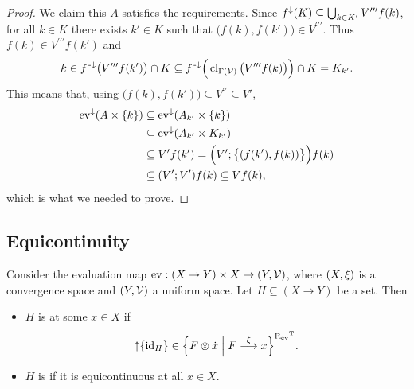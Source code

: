 \begin{proof}
We claim this $A$ satisfies the requirements. Since $f^\downarrow(K)\subseteq \bigcup_{k\in K'}V^{\prime\prime\prime}f(k)$, for all $k\in K$ there exists $k'\in K$ such that $\big(f(k), f(k')\big)\in V^{\prime\prime\prime}$. Thus $f(k) \in V^{\prime\prime\prime}f(k')$ and
\[ k\in f^{\text{\hspace{0.15em}-}\downarrow}\big(V^{\prime\prime\prime}f(k')\big)\cap K \subseteq f^{\text{\hspace{0.15em}-}\downarrow}\Big(\operatorname{cl}_{\Gamma(\mathcal{V})}\big(V^{\prime\prime\prime}f(k)\big)\Big)\cap K = K_{k'}. \]
This means that, using $\big(f(k), f(k')\big)\subseteq V^{\prime\prime}\subseteq V'$,
\begin{align*}
\operatorname{ev}^\downarrow(A\times \{k\}) &\subseteq \operatorname{ev}^\downarrow(A_{k'}\times \{k\}) \\
&\subseteq \operatorname{ev}^\downarrow(A_{k'}\times K_{k'}) \\
&\subseteq V'f(k') = \Big(V';\big\{(f(k'), f(k))\big\}\Big)f(k) \\
&\subseteq (V';V')f(k) \subseteq Vf(k),
\end{align*}
which is what we needed to prove.
\end{proof}

\subsection{Equicontinuity}
\begin{definition}
Consider the evaluation map $\evalMap: (X\to Y)\times X \to \sSet{Y,\mathcal{V}}$, where $\sSet{X, \xi}$ is a convergence space and $\sSet{Y, \mathcal{V}}$ a uniform space. Let $H\subseteq (X\to Y)$ be a set. Then
\begin{itemize}
\item $H$ is  at some $x\in X$ if
\[ \upset\{\id_H\} \in \setbuilder{F\otimes \pfilter{x}}{F\overset{\xi}{\longrightarrow}x}^{\uRelEv^\transp}. \]
\item $H$ is  if it is equicontinuous at all $x\in X$.
\end{itemize}
\end{definition}

